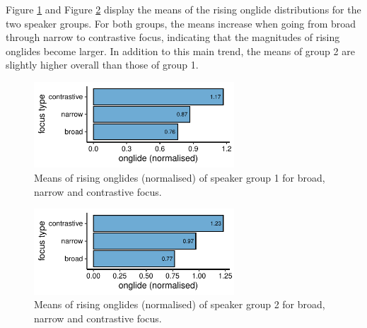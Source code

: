 Figure \ref{fig:onglide_means_group1} and Figure \ref{fig:onglide_means_group2} display the means of the rising onglide distributions for the two speaker groups. For both groups, the means increase when going from broad through narrow to contrastive focus, indicating that the magnitudes of rising onglides become larger. In addition to this main trend, the means of group 2 are slightly higher overall than those of group 1.

\begin{figure}
\includegraphics[width=7.5cm]{figures/ch6/onglide_norm_rising_means_group1.pdf}
\caption{Means of rising onglides (normalised) of speaker group 1 for broad, narrow and contrastive focus.}
\label{fig:onglide_means_group1}
\end{figure}

\begin{figure}
\includegraphics[width=7.5cm]{figures/ch6/onglide_norm_rising_means_group2.pdf}
\caption{Means of rising onglides (normalised) of speaker group 2 for broad, narrow and contrastive focus.}
\label{fig:onglide_means_group2}
\end{figure}

